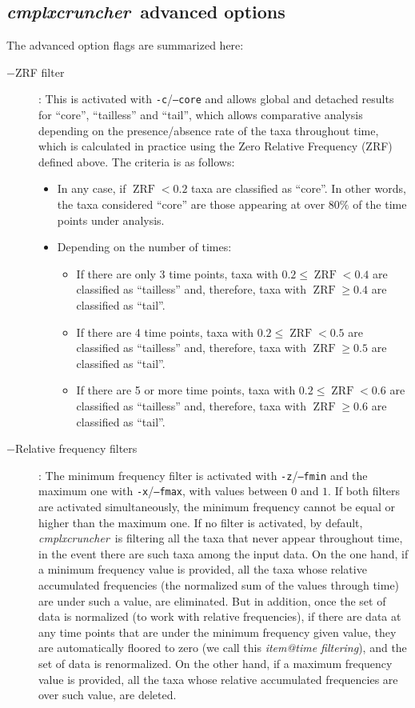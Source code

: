 \documentclass[12pt,oneside,letterpaper]{article}
\newcommand{\CC}[0]{\emph{cmplxcruncher}}
\begin{document}
\subsection{\CC\ advanced options}
The advanced option flags are summarized here:
\begin{description}
	\item[$-$ZRF filter]: This is activated with \texttt{-c}/\texttt{--core} and allows global and detached results for ``core'', ``tailless'' and ``tail'', which allows comparative analysis depending on the presence/absence rate of the taxa throughout time, which is calculated in practice using the Zero Relative Frequency (ZRF) defined above. The criteria is as follows: 
	\begin{itemize}
		\item In any case, if $\operatorname{ZRF} < 0.2$ taxa are classified as ``core''. In other words, the taxa considered ``core'' are those appearing at over $80\%$ of the time points under analysis.
		\item Depending on the number of times:
		\begin{itemize}
			\item If there are only 3 time points, taxa with $0.2 \le\operatorname{ZRF} < 0.4$ are classified as ``tailless'' and, therefore, taxa with $\operatorname{ZRF} \ge 0.4$ are classified as ``tail''.
			\item If there are 4 time points, taxa with $0.2 \le\operatorname{ZRF} < 0.5$ are classified as ``tailless'' and, therefore, taxa with $\operatorname{ZRF} \ge 0.5$ are classified as ``tail''.
			\item If there are 5 or more time points, taxa with $0.2 \le\operatorname{ZRF} < 0.6$ are classified as ``tailless'' and, therefore, taxa with $\operatorname{ZRF} \ge 0.6$ are classified as ``tail''.			      
		\end{itemize}
    \end{itemize}
	\item[$-$Relative frequency filters]: The minimum frequency filter is activated with \texttt{-z}/\texttt{--fmin} and the maximum one with \texttt{-x}/\texttt{--fmax}, with values between $0$ and $1$. If both filters are activated simultaneously, the minimum frequency cannot be equal or higher than the maximum one. If no filter is activated, by default, \CC\ is filtering all the taxa that never appear throughout time, in the event there are such taxa among the input data. On the one hand, if a minimum frequency value is provided, all the taxa whose relative accumulated frequencies (the normalized sum of the values through time) are under such a value, are eliminated. But in addition, once the set of data is normalized (to work with relative frequencies), if there are data at any time points that are under the minimum frequency given value, they are automatically floored to zero (we call this \emph{item@time filtering}), and the set of data is renormalized. On the other hand, if a maximum frequency value is provided, all the taxa whose relative accumulated frequencies are over such value, are deleted. 
\end{description}
\end{document}
